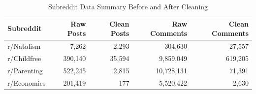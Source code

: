 \begin{table}[h]
    \centering
    \caption{Subreddit Data Summary Before and After Cleaning}
    \label{tab:subreddit_summary}
    \begin{tabular}{lrrrr}
        \toprule
        Subreddit & Raw Posts & Clean Posts & Raw Comments & Clean Comments \\
        \midrule
        r/Natalism & 7,262 & 2,293 & 304,630 & 27,557 \\
        r/Childfree & 390,140 & 35,594 & 9,859,049 & 619,205 \\
        r/Parenting & 522,245 & 2,815 & 10,728,131 & 71,391 \\
        r/Economics & 201,419 & 177 & 5,520,422 & 2,630 \\
        \bottomrule
    \end{tabular}
\end{table}

